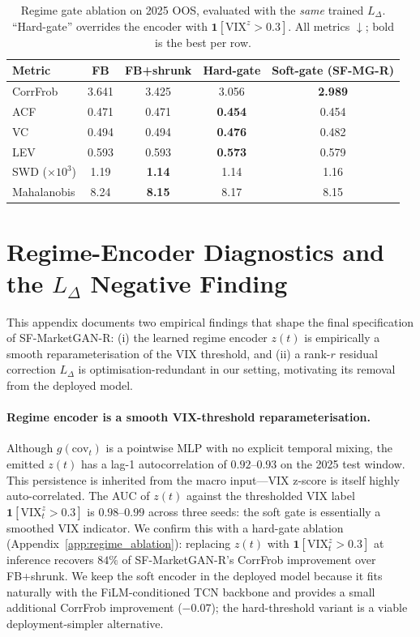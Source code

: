 \begin{table}[h]
\centering
\caption{Regime gate ablation on 2025 OOS, evaluated with the \emph{same} trained $L_\Delta$. ``Hard-gate'' overrides the encoder with $\mathbf{1}[\text{VIX}^z > 0.3]$. All metrics $\downarrow$; bold is the best per row.}
\label{tab:regime_ablation}
\small
\begin{tabular}{lcccc}
\toprule
Metric & FB & FB+shrunk & Hard-gate & Soft-gate (SF-MG-R) \\
\midrule
CorrFrob & 3.641 & 3.425 & 3.056 & \textbf{2.989} \\
ACF & 0.471 & 0.471 & \textbf{0.454} & 0.454 \\
VC & 0.494 & 0.494 & \textbf{0.476} & 0.482 \\
LEV & 0.593 & 0.593 & \textbf{0.573} & 0.579 \\
SWD ($\times 10^3$) & 1.19 & \textbf{1.14} & 1.14 & 1.16 \\
Mahalanobis & 8.24 & \textbf{8.15} & 8.17 & 8.15 \\
\bottomrule
\end{tabular}
\end{table}

\section{Regime-Encoder Diagnostics and the $L_\Delta$ Negative Finding}
\label{app:regime_diag}

This appendix documents two empirical findings that shape the final specification of SF-MarketGAN-R: (i) the learned regime encoder $z(t)$ is empirically a smooth reparameterisation of the VIX threshold, and (ii) a rank-$r$ residual correction $L_\Delta$ is optimisation-redundant in our setting, motivating its removal from the deployed model.

\paragraph{Regime encoder is a smooth VIX-threshold reparameterisation.}
Although $g(\text{cov}_t)$ is a pointwise MLP with no explicit temporal mixing, the emitted $z(t)$ has a lag-1 autocorrelation of $0.92$--$0.93$ on the 2025 test window. This persistence is inherited from the macro input---VIX z-score is itself highly auto-correlated. The AUC of $z(t)$ against the thresholded VIX label $\mathbf{1}[\text{VIX}^z_t > 0.3]$ is $0.98$--$0.99$ across three seeds: the soft gate is essentially a smoothed VIX indicator. We confirm this with a hard-gate ablation (Appendix~\ref{app:regime_ablation}): replacing $z(t)$ with $\mathbf{1}[\text{VIX}^z_t > 0.3]$ at inference recovers $84\%$ of SF-MarketGAN-R's CorrFrob improvement over FB+shrunk. We keep the soft encoder in the deployed model because it fits naturally with the FiLM-conditioned TCN backbone and provides a small additional CorrFrob improvement ($-0.07$); the hard-threshold variant is a viable deployment-simpler alternative.

